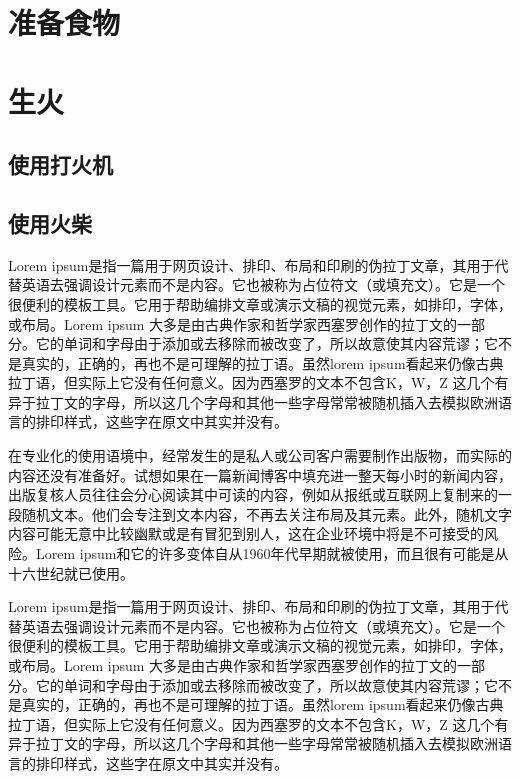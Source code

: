\documentclass[a4paper,twoside]{article}
\begin{document}
\newpage
\setcounter{page}{1}
\begin{spacing}{1.2} 

\section{准备食物}

\section{生火}

\subsection{使用打火机}
\subsection{使用火柴}

Lorem ipsum是指一篇用于网页设计、排印、布局和印刷的伪拉丁文章，其用于代替英语去强调设计元素而不是内容。它也被称为占位符文（或填充文）。它是一个很便利的模板工具。它用于帮助编排文章或演示文稿的视觉元素，如排印，字体，或布局。Lorem ipsum 大多是由古典作家和哲学家西塞罗创作的拉丁文的一部分。它的单词和字母由于添加或去移除而被改变了，所以故意使其内容荒谬；它不是真实的，正确的，再也不是可理解的拉丁语。虽然lorem ipsum看起来仍像古典拉丁语，但实际上它没有任何意义。因为西塞罗的文本不包含K，W，Z 这几个有异于拉丁文的字母，所以这几个字母和其他一些字母常常被随机插入去模拟欧洲语言的排印样式，这些字在原文中其实并没有。

在专业化的使用语境中，经常发生的是私人或公司客户需要制作出版物，而实际的内容还没有准备好。试想如果在一篇新闻博客中填充进一整天每小时的新闻内容，出版复核人员往往会分心阅读其中可读的内容，例如从报纸或互联网上复制来的一段随机文本。他们会专注到文本内容，不再去关注布局及其元素。此外，随机文字内容可能无意中比较幽默或是有冒犯到别人，这在企业环境中将是不可接受的风险。Lorem ipsum和它的许多变体自从1960年代早期就被使用，而且很有可能是从十六世纪就已使用。

\newpage

Lorem ipsum是指一篇用于网页设计、排印、布局和印刷的伪拉丁文章，其用于代替英语去强调设计元素而不是内容。它也被称为占位符文（或填充文）。它是一个很便利的模板工具。它用于帮助编排文章或演示文稿的视觉元素，如排印，字体，或布局。Lorem ipsum 大多是由古典作家和哲学家西塞罗创作的拉丁文的一部分。它的单词和字母由于添加或去移除而被改变了，所以故意使其内容荒谬；它不是真实的，正确的，再也不是可理解的拉丁语。虽然lorem ipsum看起来仍像古典拉丁语，但实际上它没有任何意义。因为西塞罗的文本不包含K，W，Z 这几个有异于拉丁文的字母，所以这几个字母和其他一些字母常常被随机插入去模拟欧洲语言的排印样式，这些字在原文中其实并没有。


\end{spacing}
\end{document}
